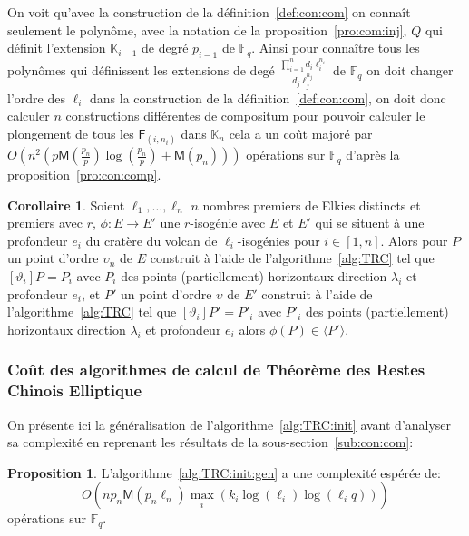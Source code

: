 \documentclass[10pt,a4paper]{book}
\theoremstyle{plain}
\theoremstyle{definition}
\theoremstyle{definition}
\newtheorem{cor}[thm]{Corollaire}
\theoremstyle{definition}
\newtheorem{prop}[thm]{Proposition}
\theoremstyle{definition}
\theoremstyle{remark}
\theoremstyle{remark}
\theoremstyle{definition}
\begin{document}
On voit qu'avec la construction de la définition~\ref{def:con:com} on connaît 
seulement le polynôme, avec la notation de la proposition~\ref{pro:com:inj}, $Q$
qui définit l'extension $\mathbb{K}_{i-1}$ de degré $p_{i-1}$ de 
$\mathbb{F}_q$. Ainsi pour connaître tous les polynômes qui définissent les 
extensions de degé $\frac{\prod_{i=1}^{n}d_i\ell_i^{n_i}}{d_j \ell_j^{n_j}}$ de
$\mathbb{F}_q$ on doit changer l'ordre des $\ell_i$ dans la construction de la 
définition~\ref{def:con:com}, on doit donc calculer $n$ constructions 
différentes de compositum pour pouvoir calculer le plongement de tous les 
$\mathsf{F}_{(i,n_i)}$ dans $\mathbb{K}_{n}$ cela a un coût majoré par 
$O(n^2(p\mathsf{M}(\frac{p_n}{p})\log(\frac{p_n}{p})+\mathsf{M}(p_n)))$ 
opérations sur $\mathbb{F}_q$ d'après la proposition~\ref{pro:con:comp}.

\begin{cor} 
Soient $\ell_1, \dots, \ell_n$ $n$ nombres premiers de Elkies distincts et 
premiers avec $r$, $\phi: E \rightarrow E'$ une $r$-isogénie avec $E$ et $E'$ 
qui se situent à une profondeur $e_i$ du cratère du volcan de 
$\ell_i$-isogénies pour $i \in [1,n]$. Alors pour $P$ un
 point d'ordre $\upsilon_n$ de $E$ construit à l'aide de 
l'algorithme~\ref{alg:TRC} tel que $[\vartheta_i]P=P_i$ 
avec $P_i$ des points (partiellement) horizontaux direction $\lambda_i$ et 
profondeur $e_i$, et $P'$ un point d'ordre $\upsilon$ de $E'$ construit à 
l'aide de l'algorithme~\ref{alg:TRC} tel que $[\vartheta_i]P'=P'_i$ avec $P'_i$
des points (partiellement) horizontaux direction $\lambda_i$ et profondeur 
$e_i$ alors $\phi(P) \in \langle P' \rangle$. 
\end{cor}

\subsubsection{Coût des algorithmes de calcul de Théorème des Restes Chinois Elliptique}

On présente ici la généralisation de l'algorithme~\ref{alg:TRC:init} avant 
d'analyser sa complexité en reprenant les résultats de la 
sous-section~\ref{sub:con:com}: 

\begin{prop}
\label{pro:alg:TRC:init:gen}
L'algorithme~\ref{alg:TRC:init:gen} a une complexité espérée de:
\[
O(n p_{n}\mathsf{M}(p_{n}\ell_{n})\max_i(k_{i}\log(\ell_{i})\log(\ell_{i}q)))
\] 
opérations sur $\mathbb{F}_q$.
\end{prop}
\end{document}
